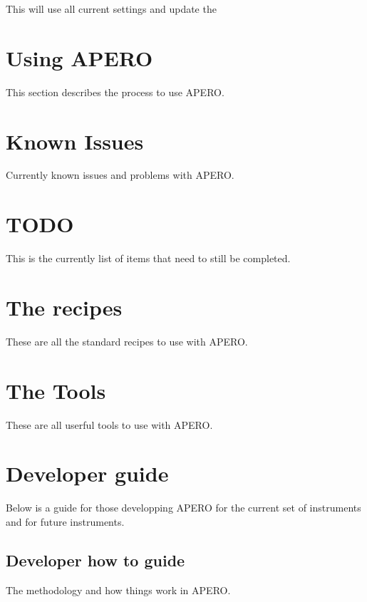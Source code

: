 \documentclass[a4paper,10pt,english]{report}
\begin{document}
This will use all current settings and update the


\chapter{Using APERO}
\label{\detokenize{user/using_apero:using-apero}}\label{\detokenize{user/using_apero:id1}}\label{\detokenize{user/using_apero::doc}}
This section describes the process to use APERO.


\chapter{Known Issues}
\label{\detokenize{user/known_issues:known-issues}}\label{\detokenize{user/known_issues:id1}}\label{\detokenize{user/known_issues::doc}}
Currently known issues and problems with APERO.


\chapter{TODO}
\label{\detokenize{user/todo:todo}}\label{\detokenize{user/todo:id1}}\label{\detokenize{user/todo::doc}}
This is the currently list of items that need to still be completed.


\chapter{The recipes}
\label{\detokenize{user/recipes:the-recipes}}\label{\detokenize{user/recipes:recipes}}\label{\detokenize{user/recipes::doc}}
These are all the standard recipes to use with APERO.


\chapter{The Tools}
\label{\detokenize{user/tools:the-tools}}\label{\detokenize{user/tools:tools}}\label{\detokenize{user/tools::doc}}
These are all userful tools to use with APERO.


\chapter{Developer guide}
\label{\detokenize{index:developer-guide}}
Below is a guide for those developping APERO for the current set of instruments and for future instruments.


\section{Developer how to guide}
\label{\detokenize{dev/dev_main:developer-how-to-guide}}\label{\detokenize{dev/dev_main:dev-main}}\label{\detokenize{dev/dev_main::doc}}
The methodology and how things work in APERO.
\end{document}
